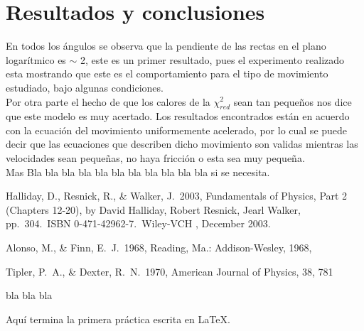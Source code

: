 \documentclass[12pt,letterpaper]{article}
\begin{document}
\section{Resultados y conclusiones}\label{con}

En todos los ángulos se observa que la pendiente de las rectas en el plano logarítmico es $ \sim $ 2, este es un primer resultado, pues el experimento realizado esta mostrando que este es el comportamiento para el tipo de movimiento estudiado, bajo algunas condiciones.\\

Por otra parte el hecho de que los calores de la  $\chi_{red}^{2}$ sean tan pequeños nos dice que este modelo es muy acertado. Los resultados encontrados están en acuerdo con la ecuación del movimiento uniformemente acelerado, por lo cual se puede decir que las ecuaciones que describen dicho movimiento son validas mientras las velocidades sean pequeñas, no haya fricción o esta sea muy pequeña. \\

Mas Bla bla bla bla bla bla bla bla bla bla bla si se necesita.




\begin{thebibliography}{100}
 Halliday, D., Resnick, 
R.,  \& Walker, J.\ 2003, Fundamentals of Physics, Part 2 (Chapters 12-20), by David Halliday, Robert Resnick, Jearl Walker, pp.~304.~ISBN 0-471-42962-7.~Wiley-VCH , December 2003.

 Alonso, M., \& Finn, E.~J.\ 1968, Reading, Ma.: Addison-Wesley, 1968,

 Tipler, P.~A., \& Dexter, R.~N.\ 1970, American Journal of Physics, 38, 781 

\end{thebibliography}
  

bla bla bla

Aquí termina la primera práctica escrita en \LaTeX.
\end{document}
